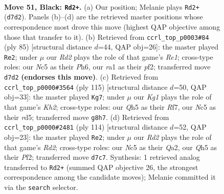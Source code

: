 \documentclass[11pt]{article}
\begin{document}
\clearpage

\begin{figure}[p]\centering
\begin{subfigure}{0.46\textwidth}\centering
\resizebox{\linewidth}{!}{%
\newchessgame
\chessboard[
  setfen={6k1/p2r4/1p6/2n1Qp1q/P1p5/6P1/1P4K1/R4R2 b - - 1 51},
  showmover=false,
  pgfstyle=straightmove, color=movearrow, markmove={d7-d2}
]}
\caption{}
\end{subfigure}\hfill
\begin{subfigure}{0.46\textwidth}\centering
\resizebox{\linewidth}{!}{%
\newchessgame
\chessboard[
  setfen={4r1k1/2q2p2/6pp/3Q4/1p6/1P3RPP/5P1K/8 b - - 0 43},
  showmover=false,
  pgfstyle=straightmove, color=movearrow, markmove={e8-e2}
]}
\caption{}
\end{subfigure}
\\[4pt]
\begin{subfigure}{0.46\textwidth}\centering
\resizebox{\linewidth}{!}{%
\newchessgame
\chessboard[
  setfen={4r3/5r1k/2q2p2/3R2p1/3RP1Pp/5Q1P/8/6K1 b - - 8 58},
  showmover=false,
  pgfstyle=straightmove, color=movearrow, markmove={h7-g7}
]}
\caption{}
\end{subfigure}\hfill
\begin{subfigure}{0.46\textwidth}\centering
\resizebox{\linewidth}{!}{%
\newchessgame
\chessboard[
  setfen={8/5p1k/5rp1/4q2p/7P/6P1/Q2R1P1K/8 w - - 22 58},
  showmover=false,
  pgfstyle=straightmove, color=movearrow, markmove={d2-e2}
]}
\caption{}
\end{subfigure}
\caption{\textbf{Move 51, Black: \texttt{Rd2+}.} (a) Our position; Melanie plays \texttt{Rd2+} (\texttt{d7d2}). Panels (b)--(d) are the retrieved master positions whose correspondence most drove this move (highest QAP objective among those that transfer to it). (b) Retrieved from \texttt{ccrl\_top\_p0003\#84} (ply 85) [structural distance $d$=44, QAP obj=26]: the master played \texttt{Re2}; under $\mu$ our \emph{Rd2} plays the role of that game's \emph{Re1}; cross-type roles: our \emph{N}c5 as their \emph{P}h6, our \emph{r}a1 as their \emph{p}f2; transferred move \texttt{d7d2} \textbf{(endorses this move)}. (c) Retrieved from \texttt{ccrl\_top\_p0000\#3564} (ply 115) [structural distance $d$=50, QAP obj=33]: the master played \texttt{Kg7}; under $\mu$ our \emph{Kg1} plays the role of that game's \emph{Kh2}; cross-type roles: our \emph{Q}h5 as their \emph{R}f7, our \emph{N}c5 as their \emph{r}d5; transferred move \texttt{g8h7}. (d) Retrieved from \texttt{ccrl\_top\_p0000\#2481} (ply 114) [structural distance $d$=52, QAP obj=23]: the master played \texttt{Re2}; under $\mu$ our \emph{Rd2} plays the role of that game's \emph{Rd2}; cross-type roles: our \emph{N}c5 as their \emph{Q}a2, our \emph{Q}h5 as their \emph{P}f2; transferred move \texttt{d7c7}. Synthesis: 1 retrieved analog transferred to \texttt{Rd2+} (summed QAP objective 26, the strongest correspondence among the candidate moves); Melanie committed it via the \texttt{search} selector.}
\label{fig:thought-m101}
\end{figure}
\end{document}

